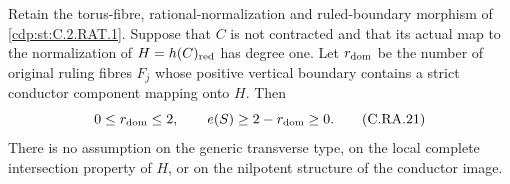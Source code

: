 
\begin{proposition}\label{cdp:st:C.2.RAT.3}
Retain the torus-fibre, rational-normalization and ruled-boundary
morphism of \ref{cdp:st:C.2.RAT.1}. Suppose that $C$ is not contracted and
that its actual map to the normalization of
$H=h(C)_{\rm red}$ has degree one. Let $r_{\rm dom}$ be the
number of original ruling fibres $F_j$ whose positive vertical
boundary contains a strict conductor component mapping onto
$H$. Then
\[
       0\le r_{\rm dom}\le2,\qquad
       e(S)\ge2-r_{\rm dom}\ge0.
\tag{C.RA.21}\label{cdp:eq:C.RA.21}
\]
There is no assumption on the generic transverse type, on the
local complete intersection property of $H$, or on the
nilpotent structure of the conductor image.
\end{proposition}
